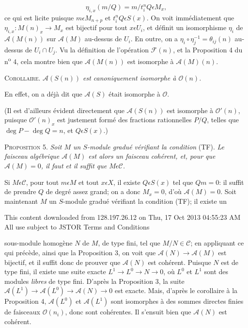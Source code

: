 \begin{equation*}
\eta_{i,x}(m/Q) = m/t_i^n Q \epsilon M_x ,
\end{equation*}
ce qui est licite puisque $m \epsilon M_{n+p}$ et $t_i^n Q \epsilon S(x)$. On voit immédiatement que $\eta_{i,x} : M(n)_x \to M_x$ est bijectif pour tout $x \epsilon U_i$, et définit un isomorphisme $\eta_i$ de $\mathcal{A}(M(n))$ sur $\mathcal{A}(M)$ au-dessus de $U_i$. En outre, on a $\eta_i \circ \eta_j^{-1} = \theta_{ij}(n)$ au-dessus de $U_i \cap U_j$. Vu la définition de l'opération $\mathcal{F}(n)$, et la Proposition 4 du n\textsuperscript{o} 4, cela montre bien que $\mathcal{A}(M(n))$ est isomorphe à $\mathcal{A}(M)(n)$.

\textsc{Corollaire}. \textit{$\mathcal{A}(S(n))$ est canoniquement isomorphe à $\mathcal{O}(n)$.}

En effet, on a déjà dit que $\mathcal{A}(S)$ était isomorphe à $\mathcal{O}$.

(Il est d'ailleurs évident directement que $\mathcal{A}(S(n))$ est isomorphe à $\mathcal{O}'(n)$, puisque $\mathcal{O}'(n)_x$ est justement formé des fractions rationnelles $P/Q$, telles que $\deg P - \deg Q = n$, et $Q \epsilon S(x)$.)

\textsc{Proposition} 5. \textit{Soit $M$ un $S$-module gradué vérifiant la condition} (TF). \textit{Le faisceau algébrique $\mathcal{A}(M)$ est alors un faisceau cohérent, et, pour que $\mathcal{A}(M) = 0$, il faut et il suffit que $M \epsilon \mathcal{C}$.}

Si $M \epsilon \mathcal{C}$, pour tout $m \epsilon M$ et tout $x \epsilon X$, il existe $Q \epsilon S(x)$ tel que $Qm = 0$: il suffit de prendre $Q$ de degré assez grand; on a donc $M_x = 0$, d'où $\mathcal{A}(M) = 0$. Soit maintenant $M$ un $S$-module gradué vérifiant la condition (TF); il existe un

This content downloaded from 128.197.26.12 on Thu, 17 Oct 2013 04:55:23 AM\\All use subject to JSTOR Terms and Conditions



 sous-module homogène $N$ de $M$, de type fini, tel que $M/N \in \mathcal{C}$; en appliquant ce qui précède, ainsi que la Proposition 3, on voit que $\mathcal{A}(N) \to \mathcal{A}(M)$ est bijectif, et il suffit donc de prouver que $\mathcal{A}(N)$ est cohérent. Puisque $N$ est de type fini, il existe une suite exacte $L^{1} \to L^{0} \to N \to 0$, où $L^{0}$ et $L^{1}$ sont des modules \textit{libres} de type fini. D'après la Proposition 3, la suite $\mathcal{A}(L^{1}) \to \mathcal{A}(L^{0}) \to \mathcal{A}(N) \to 0$ est exacte. Mais, d'après le corollaire à la Proposition 4, $\mathcal{A}(L^{0})$ et $\mathcal{A}(L^{1})$ sont isomorphes à des sommes directes finies de faisceaux $\mathcal{O}(n_{i})$, donc sont cohérentes. Il s'ensuit bien que $\mathcal{A}(N)$ est cohérent.

